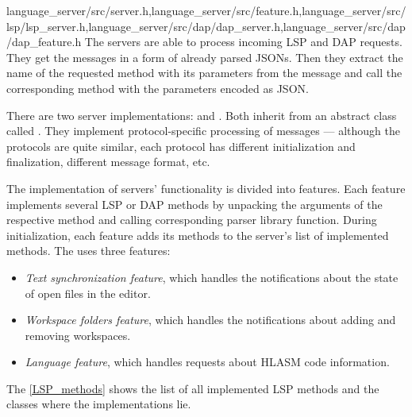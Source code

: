 
{language\_server/src/server.h,language\_server/src/feature.h,language\_server/src/lsp/lsp\_server.h,language\_server/src/dap/dap\_server.h,language\_server/src/dap/dap\_feature.h}
The servers are able to process incoming LSP and DAP requests. They get the messages in a form of already parsed JSONs. Then they extract the name of the requested method with its parameters from the message and call the corresponding method with the parameters encoded as JSON.

There are two server implementations:  and . Both inherit from an abstract class called . They implement protocol-specific processing of messages --- although the protocols are quite similar, each protocol has different initialization and finalization, different message format, etc.

The implementation of servers' functionality is divided into features. Each feature implements several LSP or DAP methods by unpacking the arguments of the respective method and calling corresponding parser library function. During initialization, each feature adds its methods to the server's list of implemented methods. The  uses three features:
\begin{itemize}
	\item \emph{Text synchronization feature}, which handles the notifications about the state of open files in the editor.
	\item \emph{Workspace folders feature}, which handles the notifications about adding and removing workspaces.
	\item \emph{Language feature}, which handles requests about HLASM code information.
\end{itemize}
The \cref{LSP_methods} shows the list of all implemented LSP methods and the classes where the implementations lie.

